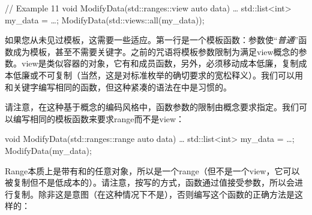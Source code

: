 \begin{code}
// Example 11
void ModifyData(std::ranges::view auto data) { … }
std::list<int> my_data = …;
ModifyData(std::views::all(my_data));
\end{code}

如果您从未见过\cpp[20] 模板，这需要一些适应。第一行是一个模板函数：参数使“\emph{普通}”函数成为模板，甚至不需要关键字。之前的咒语将模板参数限制为满足view概念的参数。view是类似容器的对象，它有和成员函数，另外，必须移动成本低廉，复制成本低廉或不可复制（当然，这是对标准枚举的确切要求的宽松释义）。我们可以用和关键字编写相同的函数，但这种紧凑的语法在\cpp[20] 中是习惯的。

请注意，在这种基于概念的编码风格中，函数参数的限制由概念要求指定。我们可以编写相同的模板函数来要求range而不是view：

\begin{code}
void ModifyData(std::ranges::range auto data) { … }
std::list<int> my_data = …;
ModifyData(my_data);
\end{code}

Range本质上是带有和的任意对象，所以是一个range（但不是一个view，它可以被复制但不是低成本的）。请注意，按写的方式，函数通过值接受参数，所以会进行复制。除非这是意图（在这种情况下不是），否则编写这个函数的正确方法是这样的：

